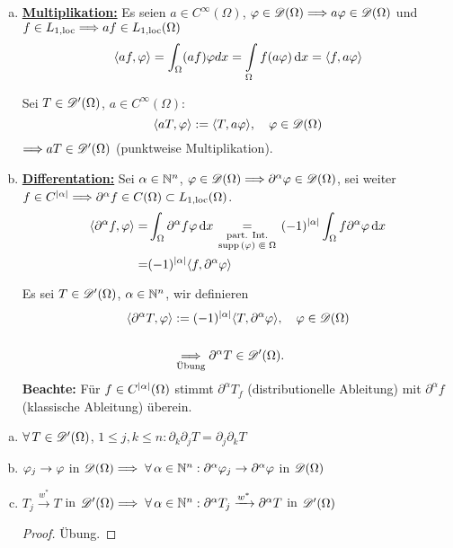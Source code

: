 \begin{bemdef}
  \begin{enumerate}[(a)]
  \item \textbf{\underline{Multiplikation:}} Es seien $a\in C^\infty(\Omega)$, $\varphi\in\mathscr{D}(\Omega)\Longrightarrow a\varphi\in\mathscr{D}(\Omega)$ und $f\in L_{1,\scriptsize{\textnormal{loc}}}\Longrightarrow af\in L_{1,\scriptsize{\textnormal{loc}}}(\Omega)$
    \[
    \langle af,\varphi\rangle=\int_\Omega (af)\varphi dx=\int\limits_\Omega f(a\varphi)\,\mathrm{d} x
    =\langle f,a\varphi\rangle
    \]
    \begin{defi} Sei
      $T\in\mathscr{D}'(\Omega)$, $a\in C^\infty(\Omega)$:
      \[ \langle aT,\varphi\rangle:=\langle T, a\varphi\rangle,\quad\varphi\in\mathscr{D}(\Omega) \]
      $\Longrightarrow aT\in\mathscr{D}'(\Omega)$ (punktweise Multiplikation).
    \end{defi}

  \item \textbf{\underline{Differentation:}} Sei $\alpha\in\mathbb{N}^n$, $\varphi\in\mathscr{D}(\Omega)\Longrightarrow\partial^\alpha\varphi\in\mathscr{D}(\Omega)$, sei weiter $f\in C^{\lvert \alpha\rvert}\Longrightarrow\partial^\alpha f\in C(\Omega)\subset L_{1,\scriptsize{\textnormal{loc}}}(\Omega)$.
    \begin{align*}
      \<\partial^\alpha f,\varphi\>=&\int_\Omega\partial^\alpha f\varphi\d x
      \underset{\parbox{1.7cm}{\scriptsize\centering\text{part. Int.} \\
          supp$\,(\varphi)\Subset\Omega$}}=(-1)^{\abs\alpha}\int_\Omega f\partial^\alpha\varphi\d x \\
      =&(-1)^{\abs\alpha}\<f,\partial^\alpha\varphi\>
    \end{align*}
    \begin{defi}
     Es sei  $T\in\mathscr{D}'(\Omega)$, $\alpha\in\mathbb{N}^n$, wir definieren
      \begin{align*} \langle\partial^\alpha T,\varphi\rangle&:=(-1)^{\lvert \alpha\rvert}\langle T,\partial^\alpha\varphi\rangle,\quad\varphi\in\mathscr{D}(\Omega) \\
      & \\
    &  \underset{\scriptsize\text{Übung}}{\Longrightarrow}\partial^\alpha T \in \mathscr{D}'(\Omega).
    \end{align*}
      \textbf{Beachte:} Für $f\in C^{\lvert \alpha\rvert}(\Omega)$ stimmt $\partial^\alpha T_f$ (distributionelle Ableitung) mit $\partial^\alpha f$ (klassische Ableitung) überein.
    \end{defi}
  \end{enumerate}
\end{bemdef}

\begin{bem}
  \label{bem:3.9}
  \begin{enumerate}[(a)]
  \item $\forall\,  T\in\mathscr{D}'(\Omega)$, $1\leq j,k\leq n: \partial_k\partial_j T=\partial_j\partial_k T$
  \item $\varphi_j\rightarrow\varphi$ in $\mathscr{D}(\Omega)\Longrightarrow\;\forall\,\alpha\in\mathbb{N}^n: \partial^\alpha\varphi_j\rightarrow\partial^\alpha\varphi$ in $\mathscr{D}(\Omega)$
  \item $T_j\xrightarrow{w^*}T$ in $\mathscr{D}'(\Omega)\Longrightarrow\;\forall\,\alpha\in\mathbb{N}^n:\partial^\alpha T_j\xrightarrow{w^*}\partial^\alpha T$ in $\mathscr{D}'(\Omega)$
    \begin{proof}
      Übung.
    \end{proof}
  \end{enumerate}
\end{bem}

